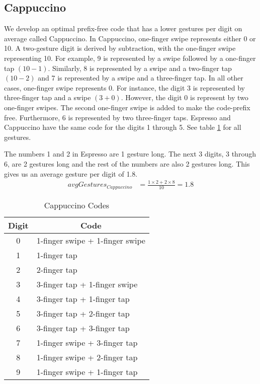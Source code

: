 \subsection{Cappuccino}
We develop an optimal prefix-free code that has a lower gestures per digit on average called Cappuccino. In Cappuccino, one-finger swipe represents either 0 or 10. A two-gesture digit is derived by subtraction, with the one-finger swipe representing 10. For example, 9 is represented by a swipe followed by a one-finger tap $(10 - 1)$. Similarly, 8 is represented by a swipe and a two-finger tap $(10 - 2)$ and 7 is represented by a swipe and a three-finger tap. In all other cases, one-finger swipe represents 0. For instance, the digit 3 is represented by three-finger tap and a swipe $(3 + 0)$. However, the digit 0 is represent by two one-finger swipes. The second one-finger swipe is added to make the code-prefix free. Furthermore, 6 is represented by two three-finger taps. Espresso and Cappuccino have the same code for the digits 1 through 5. See table \ref{cappuccino} for all gestures.
\par
The numbers 1 and 2 in Espresso are 1 gesture long. The next 3 digits, 3 through 6, are 2 gestures long and the rest of the numbers are also 2 gestures long. This gives us an average gesture per digit of 1.8.
  \begin{align*}
    avgGestures_{Cappuccino} &= \frac{1\times2 + 2\times8}{10} = 1.8
  \end{align*}

\begin{table}[ht]
  \caption{Cappuccino Codes}
  \centering
  \begin{tabular}{cl}
  \hline
  \multicolumn{1}{c}{Digit} & \multicolumn{1}{c}{Code} \\
  \hline
  0 & 1-finger swipe + 1-finger swipe \\
  1 & 1-finger tap \\
  2 & 2-finger tap \\
  3 & 3-finger tap + 1-finger swipe \\
  4 & 3-finger tap + 1-finger tap \\
  5 & 3-finger tap + 2-finger tap \\
  6 & 3-finger tap + 3-finger tap \\
  7 & 1-finger swipe + 3-finger tap \\
  8 & 1-finger swipe + 2-finger tap \\
  9 & 1-finger swipe + 1-finger tap \\ [1ex]
  \hline
  \end{tabular}
  \label{cappuccino}
\end{table}


